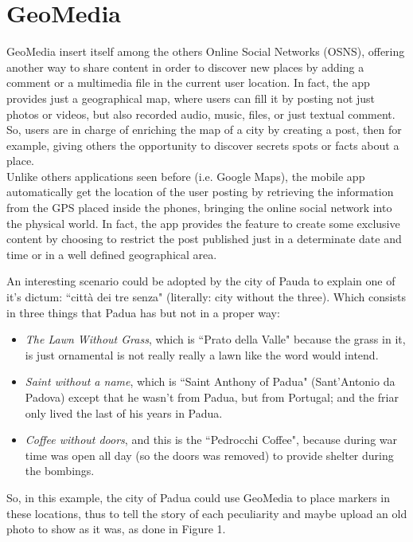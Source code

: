 \documentclass[conference]{IEEEtran}
\begin{document}
\section{GeoMedia}

GeoMedia insert itself among the others Online Social Networks (OSNS), offering another way to share content in order to discover new places by adding a comment or a multimedia file in the current user location.
In fact, the app provides just a geographical map, where users can fill it by posting
not just photos or videos, but also recorded audio, music, files, or just textual comment.
So, users are in charge of enriching the map of a city by creating a post, then for example, giving others the opportunity to discover secrets spots or facts about a place.
\\
Unlike others applications seen before (i.e. Google Maps), the mobile app automatically get the location of the user posting by retrieving the information from the GPS placed inside the phones, bringing the online social network into the physical world. In fact, the app provides the feature to create some exclusive content by choosing to restrict the post published just in a determinate date and time or in a well defined geographical area.

An interesting scenario could be adopted by the city of Pauda to explain one of it's dictum: ``città dei tre senza" (literally: city without the three).
Which consists in three things that Padua has but not in a proper way:
\begin{itemize}
    \item \textit{The Lawn Without Grass}, which is ``Prato della Valle" because the grass in it, is just ornamental is not really really a lawn like the word would intend.
    \item \textit{Saint without a name}, which is ``Saint Anthony of Padua" (Sant'Antonio da Padova) except that he wasn't from Padua, but from Portugal; and the friar only lived the last of his years in Padua.
    \item \textit{Coffee without doors}, and this is the ``Pedrocchi Coffee", because during war time was open all day (so the doors was removed) to provide shelter during the bombings.
\end{itemize}
So, in this example, the city of Padua could use GeoMedia to place markers in these locations, thus to tell the story of each peculiarity and maybe upload an old photo to show as it was, as done in Figure 1.
\\
\end{document}

